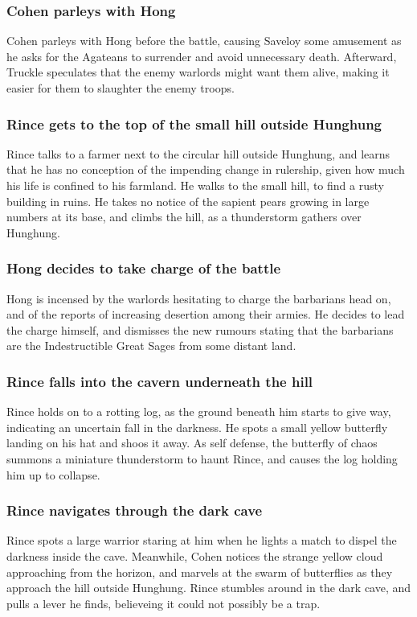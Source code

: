 \subsubsection{\Gls{Cohen} parleys with \Gls{Hong}}
\Gls{Cohen} parleys with \Gls{Hong} before the battle, causing \Gls{Saveloy} some amusement as he
asks for the Agateans to surrender and avoid unnecessary death. Afterward, \Gls{Truckle} speculates
that the enemy warlords might want them alive, making it easier for them to slaughter the enemy
troops.

\subsubsection{\Gls{Rince} gets to the top of the small hill outside Hunghung}
\Gls{Rince} talks to a farmer next to the circular hill outside Hunghung, and learns that he has no
conception of the impending change in rulership, given how much his life is confined to his
farmland. He walks to the small hill, to find a rusty building in ruins. He takes no notice of the
sapient pears growing in large numbers at its base, and climbs the hill, as a thunderstorm gathers
over Hunghung.

\subsubsection{\Gls{Hong} decides to take charge of the battle}
\Gls{Hong} is incensed by the warlords hesitating to charge the barbarians head on, and of the
reports of increasing desertion among their armies. He decides to lead the charge himself, and
dismisses the new rumours stating that the barbarians are the Indestructible Great Sages from some
distant land.

\subsubsection{\Gls{Rince} falls into the cavern underneath the hill}
\Gls{Rince} holds on to a rotting log, as the ground beneath him starts to give way, indicating an
uncertain fall in the darkness. He spots a small yellow butterfly landing on his hat and shoos it
away. As self defense, the butterfly of chaos summons a miniature thunderstorm to haunt \Gls{Rince},
and causes the log holding him up to collapse.

\subsubsection{\Gls{Rince} navigates through the dark cave}
\Gls{Rince} spots a large warrior staring at him when he lights a match to dispel the darkness
inside the cave. Meanwhile, \Gls{Cohen} notices the strange yellow cloud approaching from the
horizon, and marvels at the swarm of butterflies as they approach the hill outside Hunghung.
\Gls{Rince} stumbles around in the dark cave, and pulls a lever he finds, believeing it could not
possibly be a trap.

